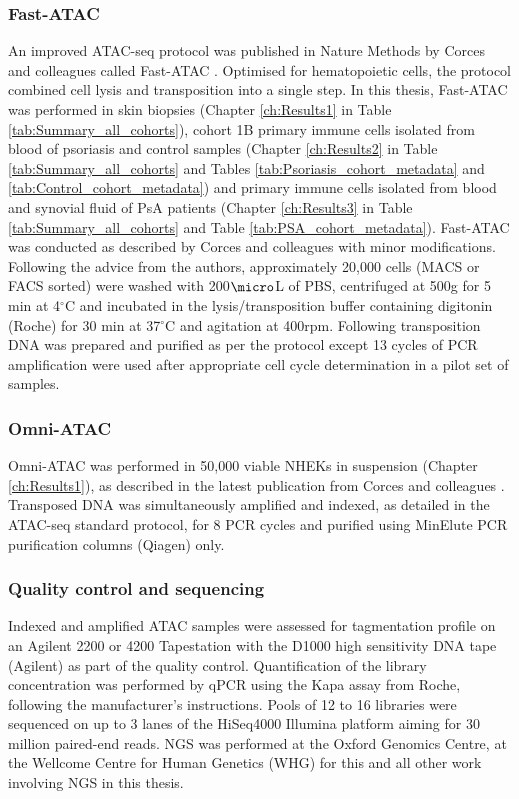 \subsubsection{Fast-ATAC}
An improved ATAC-seq protocol was published in Nature Methods by Corces and colleagues called Fast-ATAC \parencite{Corces2016}. Optimised for hematopoietic cells, the protocol combined cell lysis and transposition into a single step. In this thesis, Fast-ATAC was performed in skin biopsies (Chapter \ref{ch:Results1} in Table \ref{tab:Summary_all_cohorts}), cohort 1B primary immune cells isolated from blood of psoriasis and control samples (Chapter \ref{ch:Results2} in Table \ref{tab:Summary_all_cohorts} and Tables \ref{tab:Psoriasis_cohort_metadata} and \ref{tab:Control_cohort_metadata}) and primary immune cells isolated from blood and synovial fluid of PsA patients (Chapter \ref{ch:Results3} in Table \ref{tab:Summary_all_cohorts} and Table \ref{tab:PSA_cohort_metadata}). Fast-ATAC was conducted as described by Corces and colleagues with minor modifications. Following the advice from the authors, approximately 20,000 cells (MACS or FACS sorted) were washed with 200$\micro$L of PBS, centrifuged at 500g for 5 min at 4$^\circ$C and incubated in the lysis/transposition buffer containing digitonin (Roche) for 30 min at 37{$^\circ$}C and agitation at 400rpm. Following transposition DNA was prepared and purified as per the protocol except 13 cycles of PCR amplification were used after appropriate cell cycle determination in a pilot set of samples.

\subsubsection{Omni-ATAC}
Omni-ATAC was performed in 50,000 viable NHEKs in suspension (Chapter \ref{ch:Results1}), as described in the latest publication from Corces and colleagues \parencite{Corces2017}. Transposed DNA was simultaneously amplified and indexed, as detailed in the ATAC-seq standard protocol, for 8 PCR cycles and purified using MinElute PCR purification columns (Qiagen) only. 


\subsubsection{Quality control and sequencing}
Indexed and amplified ATAC samples were assessed for tagmentation profile on an Agilent 2200 or 4200 Tapestation with the D1000 high sensitivity DNA tape (Agilent) as part of the quality control. Quantification of the library concentration was performed by qPCR using the Kapa assay from Roche, following the manufacturer's instructions. Pools of 12 to 16 libraries were sequenced on up to 3 lanes of the HiSeq4000 Illumina platform  aiming for 30 million paired-end reads. NGS was performed at the Oxford Genomics Centre, at the Wellcome Centre for Human Genetics (WHG) for this and all other work involving NGS in this thesis.

